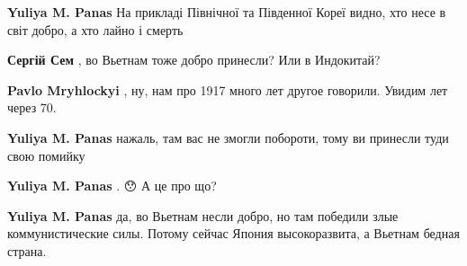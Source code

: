 \begin{itemize}
\begin{itemize}
\begin{itemize}
\textbf{Yuliya M. Panas} На прикладі Північної та Південної Кореї видно, хто несе в світ добро, а хто лайно і смерть

 
\textbf{Сергій Сем} , во Вьетнам тоже добро принесли? Или в Индокитай?

 
\textbf{Pavlo Mryhlockyi} , ну, нам про 1917 много лет другое говорили. Увидим лет через 70.

 
\textbf{Yuliya M. Panas} нажаль, там вас не змогли побороти, тому ви принесли туди свою помийку

 
\textbf{Yuliya M. Panas} . 😯 А це про що?

 
\textbf{Yuliya M. Panas} да, во Вьетнам несли добро, но там победили злые коммунистические силы. Потому сейчас Япония высокоразвита, а Вьетнам бедная страна.
\end{itemize}

 

\end{itemize}
\end{itemize}
